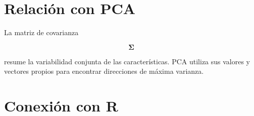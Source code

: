 \documentclass[
  spanish,
  10.5pt,
  letterpaper,
  DIV=11,
  numbers=noendperiod,
  oneside,
  open=any]{scrreprt}
\theoremstyle{definition}
\theoremstyle{definition}
\theoremstyle{plain}
\theoremstyle{remark}
\begin{document}
\section*{Relación con PCA}\label{relaciuxf3n-con-pca-1}


La matriz de covarianza

\[
\boldsymbol{\Sigma}
\]

resume la variabilidad conjunta de las características. PCA utiliza sus
valores y vectores propios para encontrar direcciones de máxima
varianza.

\section*{Conexión con R}\label{conexiuxf3n-con-r-2}

\end{document}
